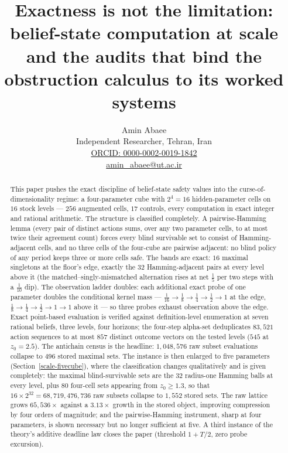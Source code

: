 \documentclass[10pt,twocolumn]{article}
\theoremstyle{plain}
\theoremstyle{definition}
\theoremstyle{remark}
\begin{document}
\title{Exactness is not the limitation: belief-state computation at scale and the audits that bind the obstruction calculus to its worked systems}

\author{Amin Abaee\\[0.35em]
{\small Independent Researcher, Tehran, Iran}\\[0.55em]
{\small\href{https://orcid.org/0000-0002-0019-1842}{ORCID: 0000-0002-0019-1842}}\\[0.3em]
{\small\href{mailto:amin\_abaee@ut.ac.ir}{amin\_abaee@ut.ac.ir}}}
\maketitle

\begin{abstract}
This paper pushes the exact discipline of belief-state safety values into the curse-of-dimensionality regime: a four-parameter cube with
\(2^{4} = 16\) hidden-parameter cells on \(16\) stock levels ---
\(256\) augmented cells, \(17\) controls, every computation in exact
integer and rational arithmetic. The structure is classified
completely. A pairwise-Hamming lemma (every pair of distinct actions
sums, over any two parameter cells, to at most twice their agreement
count) forces every blind survivable set to consist of
Hamming-adjacent cells, and no three cells of the four-cube are
pairwise adjacent: no blind policy of any period keeps three or more
cells safe. The bands are exact: \(16\) maximal singletons at the
floor's edge, exactly the \(32\) Hamming-adjacent pairs at every level
above it (the matched--singly-mismatched alternation rises at net
\(\tfrac15\) per two steps with a \(\tfrac1{10}\) dip). The
observation ladder doubles: each additional exact probe of one
parameter doubles the conditional kernel mass ---
\(\tfrac1{16} \to \tfrac18 \to \tfrac14 \to \tfrac12 \to 1\) at the
edge, \(\tfrac18 \to \tfrac14 \to \tfrac12 \to 1 \to 1\) above it ---
so three probes exhaust observation above the edge. Exact point-based
evaluation is verified against definition-level enumeration at seven
rational beliefs, three levels, four horizons; the four-step alpha-set
deduplicates \(83{,}521\) action sequences to at most \(857\) distinct
outcome vectors on the tested levels (\(545\) at \(z_0=2.5\)). The antichain census is the headline: \(1{,}048{,}576\) raw subset evaluations collapse to \(496\) stored maximal sets. The instance is then enlarged to five parameters (Section~\ref{scale-fivecube}), where the classification changes qualitatively and is given completely: the maximal blind-survivable sets are the \(32\) radius-one Hamming balls at every level, plus \(80\) four-cell sets appearing from \(z_{0} \ge 1.3\), so that \(16 \times 2^{32} = 68{,}719{,}476{,}736\) raw subsets collapse to \(1{,}552\) stored sets. The raw lattice grows \(65{,}536\times\) against a \(3.13\times\) growth in the stored object, improving compression by four orders of magnitude; and the pairwise-Hamming instrument, sharp at four parameters, is shown necessary but no longer sufficient at five. A third instance of the theory's additive deadline law closes the paper (threshold \(1 + T/2\), zero probe excursion).
\end{abstract}
\end{document}
